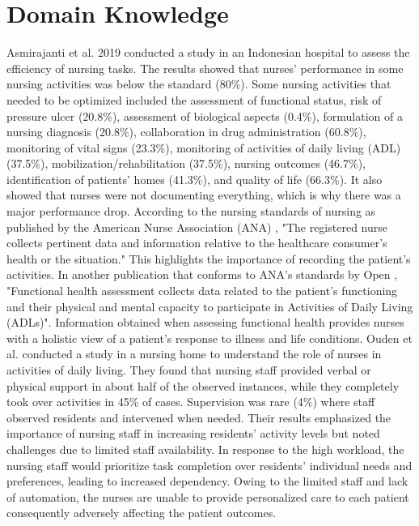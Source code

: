 \section{Domain Knowledge}
Asmirajanti et al. 2019 \cite{nurse-performance} conducted a study in an Indonesian hospital to assess the efficiency of nursing tasks. The results showed that nurses' performance in some nursing activities was below the standard (80\%). Some nursing activities that needed to be optimized included the assessment of functional status, risk of pressure ulcer (20.8\%), assessment of biological aspects (0.4\%), formulation of a nursing diagnosis (20.8\%), collaboration in drug administration (60.8\%), monitoring of vital signs (23.3\%), monitoring of activities of daily living (ADL) (37.5\%), mobilization/rehabilitation (37.5\%), nursing outcomes (46.7\%), identification of patients’ homes (41.3\%), and quality of life (66.3\%). It also showed that nurses were not documenting everything, which is why there was a major performance drop. According to the nursing standards of nursing as published by the American Nurse Association (ANA) \cite{ANA}, "The registered nurse collects pertinent data and information relative to the 
healthcare consumer’s health or the situation." This highlights the importance of recording the patient's activities. In another publication that conforms to ANA's standards by Open \cite{OPEN-RN}, "Functional health assessment collects data related to the patient’s functioning and their physical and mental capacity to participate in Activities of Daily Living (ADLs)". Information obtained when assessing functional health provides nurses with a holistic view of a patient's response to illness and life conditions.
Ouden et al. \cite{role-of-nursing} conducted a study in a nursing home to understand the role of nurses in activities of daily living. They found that nursing staff provided verbal or physical support in about half of the observed instances, while they completely took over activities in 45\% of cases. Supervision was rare (4\%) where staff observed residents and intervened when needed. Their results emphasized the importance of nursing staff in increasing residents' activity levels but noted challenges due to limited staff availability. In response to the high workload, the nursing staff would prioritize task completion over residents' individual needs and preferences, leading to increased dependency.
Owing to the limited staff and lack of automation, the nurses are unable to provide personalized care to each patient consequently adversely affecting the patient outcomes.  

